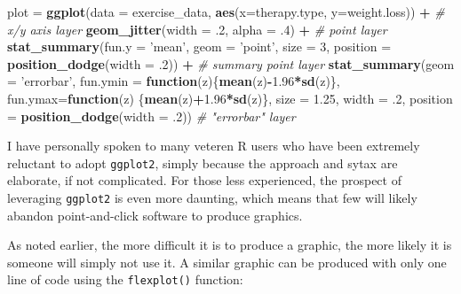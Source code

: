 \documentclass[
  man]{apa6}
\newenvironment{Shaded}{\begin{snugshade}}{\end{snugshade}}
\newcommand{\CommentTok}[1]{\textcolor[rgb]{0.56,0.35,0.01}{\textit{#1}}}
\newcommand{\ControlFlowTok}[1]{\textcolor[rgb]{0.13,0.29,0.53}{\textbf{#1}}}
\newcommand{\DataTypeTok}[1]{\textcolor[rgb]{0.13,0.29,0.53}{#1}}
\newcommand{\DecValTok}[1]{\textcolor[rgb]{0.00,0.00,0.81}{#1}}
\newcommand{\FloatTok}[1]{\textcolor[rgb]{0.00,0.00,0.81}{#1}}
\newcommand{\KeywordTok}[1]{\textcolor[rgb]{0.13,0.29,0.53}{\textbf{#1}}}
\newcommand{\NormalTok}[1]{#1}
\newcommand{\OperatorTok}[1]{\textcolor[rgb]{0.81,0.36,0.00}{\textbf{#1}}}
\newcommand{\StringTok}[1]{\textcolor[rgb]{0.31,0.60,0.02}{#1}}
\begin{document}
\begin{Shaded}
\begin{Highlighting}[]
\NormalTok{plot =}\StringTok{ }\KeywordTok{ggplot}\NormalTok{(}\DataTypeTok{data =}\NormalTok{ exercise_data, }\KeywordTok{aes}\NormalTok{(}\DataTypeTok{x=}\NormalTok{therapy.type, }\DataTypeTok{y=}\NormalTok{weight.loss)) }\OperatorTok{+}\StringTok{ }
\StringTok{      }\CommentTok{# x/y axis layer}
\StringTok{  }\KeywordTok{geom_jitter}\NormalTok{(}\DataTypeTok{width =} \FloatTok{.2}\NormalTok{, }\DataTypeTok{alpha =} \FloatTok{.4}\NormalTok{) }\OperatorTok{+}\StringTok{ }
\StringTok{      }\CommentTok{# point layer}
\StringTok{  }\KeywordTok{stat_summary}\NormalTok{(}\DataTypeTok{fun.y =} \StringTok{'mean'}\NormalTok{, }\DataTypeTok{geom =} \StringTok{'point'}\NormalTok{, }
        \DataTypeTok{size =} \DecValTok{3}\NormalTok{, }\DataTypeTok{position =} \KeywordTok{position_dodge}\NormalTok{(}\DataTypeTok{width =} \FloatTok{.2}\NormalTok{)) }\OperatorTok{+}\StringTok{ }
\StringTok{      }\CommentTok{# summary point layer}
\StringTok{  }\KeywordTok{stat_summary}\NormalTok{(}\DataTypeTok{geom =} \StringTok{'errorbar'}\NormalTok{, }\DataTypeTok{fun.ymin =} \ControlFlowTok{function}\NormalTok{(z)\{}\KeywordTok{mean}\NormalTok{(z)}\OperatorTok{-}\FloatTok{1.96}\OperatorTok{*}\KeywordTok{sd}\NormalTok{(z)\}, }
        \DataTypeTok{fun.ymax=}\ControlFlowTok{function}\NormalTok{(z) \{}\KeywordTok{mean}\NormalTok{(z)}\OperatorTok{+}\FloatTok{1.96}\OperatorTok{*}\KeywordTok{sd}\NormalTok{(z)\}, }
        \DataTypeTok{size =} \FloatTok{1.25}\NormalTok{, }\DataTypeTok{width =} \FloatTok{.2}\NormalTok{, }\DataTypeTok{position =} \KeywordTok{position_dodge}\NormalTok{(}\DataTypeTok{width =} \FloatTok{.2}\NormalTok{))  }
      \CommentTok{# "errorbar" layer}
\end{Highlighting}
\end{Shaded}

I have personally spoken to many veteren R users who have been extremely reluctant to adopt \texttt{ggplot2}, simply because the approach and sytax are elaborate, if not complicated. For those less experienced, the prospect of leveraging \texttt{ggplot2} is even more daunting, which means that few will likely abandon point-and-click software to produce graphics.

As noted earlier, the more difficult it is to produce a graphic, the more likely it is someone will simply not use it. A similar graphic can be produced with only one line of code using the \texttt{flexplot()} function:
\end{document}
